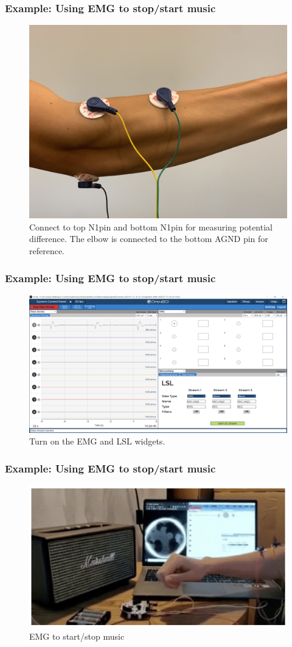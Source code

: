 \documentclass{beamer}
\begin{document}
\begin{frame}
\frametitle{Example: Using EMG to stop/start music}
\begin{figure}
	\includegraphics[width=0.7\linewidth]{image/emgplacement}
	\caption{Connect to top N1pin and bottom N1pin for measuring potential difference.  The elbow is connected to the bottom AGND pin for reference.}
\end{figure}
\end{frame}

\begin{frame}
\frametitle{Example: Using EMG to stop/start music}
\begin{figure}
	\includegraphics[width=0.7\linewidth]{image/lsl2}
	\caption{Turn on the EMG and LSL widgets.}
\end{figure}
\end{frame}

\begin{frame}
\frametitle{Example: Using EMG to stop/start music}
\begin{figure}
	\includegraphics[width=0.7\linewidth]{image/emgcontrol}
	\caption{EMG to start/stop music}
\end{figure}
\end{frame}
\end{document}
